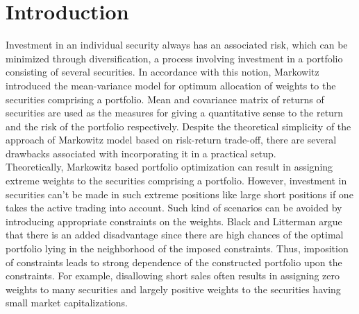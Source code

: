 \documentclass[a4paper,12pt,twoside]{article}
\begin{document}
\section{Introduction}
Investment in an individual security always has an associated risk, which can be minimized through diversification, a process involving  investment in a portfolio consisting of several securities. In accordance with this notion, Markowitz \cite{Markowitz1,Markowitz2} introduced the mean-variance model for optimum allocation of weights to the securities comprising a portfolio. Mean and covariance matrix of returns of securities are used as the measures for giving a quantitative sense to the return and the risk of the portfolio respectively. Despite the theoretical simplicity of the approach of Markowitz model based on risk-return trade-off, there are several drawbacks associated with incorporating it in a practical setup.\\

Theoretically, Markowitz based portfolio optimization can result in assigning extreme weights to the securities comprising a portfolio. However, investment in securities can't be made in such extreme positions like large short positions if one takes the active trading into account. Such kind of scenarios can be avoided by introducing appropriate constraints on the weights.  Black and Litterman \cite{Black} argue that there is an added disadvantage since there are high chances of the optimal portfolio lying in the neighborhood of the imposed constraints. Thus, imposition of constraints leads to strong dependence of the constructed portfolio upon the constraints. For example, disallowing short sales often results in assigning zero weights to many securities and largely positive weights to the securities having small market capitalizations. \\
\end{document}
